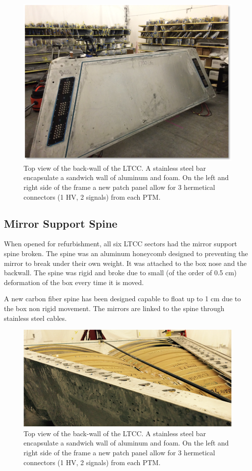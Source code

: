 \begin{figure}
	\centering
	\includegraphics[width=0.95\columnwidth,keepaspectratio]{img/backWall.png}
	\caption{Top view of the back-wall of the LTCC. A stainless steel bar encapsulate a sandwich wall of aluminum and foam. On the left and right side
            of the frame a new patch panel allow for 3 hermetical connectors (1 HV, 2 signals) from each PTM. }
	\label{fig:backWall}
\end{figure}


\subsection{Mirror Support Spine}

When opened for refurbishment, all six LTCC sectors had the mirror support spine broken. The spine was an aluminum honeycomb designed to preventing
the mirror to break under their own weight. It was attached to the box nose and the backwall. The spine was rigid and broke due to small (of the order of 0.5 cm) deformation of the box every time it
is moved.

A new carbon fiber spine has been designed capable to float up to 1 cm due to the box non rigid movement. The mirrors are linked to the spine through stainless steel cables.


\begin{figure}
	\centering
	\includegraphics[width=1.0\columnwidth,keepaspectratio]{img/spine.png}
	\caption{Top view of the back-wall of the LTCC. A stainless steel bar encapsulate a sandwich wall of aluminum and foam. On the left and right side
            of the frame a new patch panel allow for 3 hermetical connectors (1 HV, 2 signals) from each PTM. }
	\label{fig:spine}
\end{figure}

